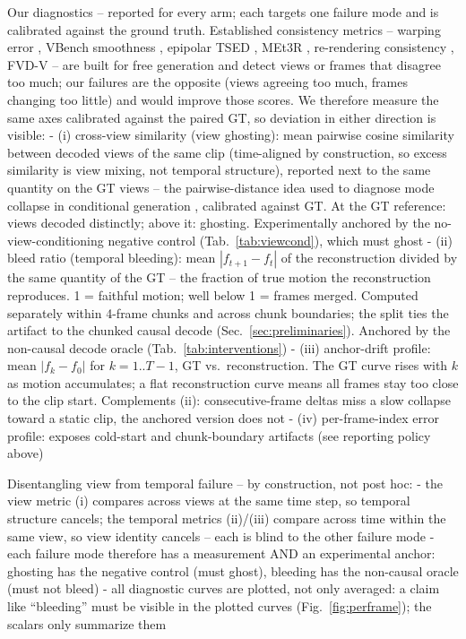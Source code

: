 Our diagnostics -- reported for every arm; each targets one failure mode and is calibrated against the ground truth. Established consistency metrics -- warping error \cite{lai2018learning}, VBench smoothness \cite{huang2024vbench}, epipolar TSED \cite{yu2023long}, MEt3R \cite{asim2025met3r}, re-rendering consistency \cite{gao2024cat3d}, FVD-V \cite{xie2024sv4d} -- are built for free generation and detect views or frames that disagree too much; our failures are the opposite (views agreeing too much, frames changing too little) and would improve those scores. We therefore measure the same axes calibrated against the paired GT, so deviation in either direction is visible:
- (i) cross-view similarity (view ghosting): mean pairwise cosine similarity between decoded views of the same clip (time-aligned by construction, so excess similarity is view mixing, not temporal structure), reported next to the same quantity on the GT views -- the pairwise-distance idea used to diagnose mode collapse in conditional generation \cite{zhu2017toward}, calibrated against GT. At the GT reference: views decoded distinctly; above it: ghosting. Experimentally anchored by the no-view-conditioning negative control (Tab.~\ref{tab:viewcond}), which must ghost
- (ii) bleed ratio (temporal bleeding): mean $|f_{t+1} - f_t|$ of the reconstruction divided by the same quantity of the GT -- the fraction of true motion the reconstruction reproduces. 1 = faithful motion; well below 1 = frames merged. Computed separately within 4-frame chunks and across chunk boundaries; the split ties the artifact to the chunked causal decode (Sec.~\ref{sec:preliminaries}). Anchored by the non-causal decode oracle (Tab.~\ref{tab:interventions})
- (iii) anchor-drift profile: mean $|f_k - f_0|$ for $k = 1..T{-}1$, GT vs.\ reconstruction. The GT curve rises with $k$ as motion accumulates; a flat reconstruction curve means all frames stay too close to the clip start. Complements (ii): consecutive-frame deltas miss a slow collapse toward a static clip, the anchored version does not
- (iv) per-frame-index error profile: exposes cold-start and chunk-boundary artifacts (see reporting policy above)

Disentangling view from temporal failure -- by construction, not post hoc:
- the view metric (i) compares across views at the same time step, so temporal structure cancels; the temporal metrics (ii)/(iii) compare across time within the same view, so view identity cancels -- each is blind to the other failure mode
- each failure mode therefore has a measurement AND an experimental anchor: ghosting has the negative control (must ghost), bleeding has the non-causal oracle (must not bleed)
- all diagnostic curves are plotted, not only averaged: a claim like ``bleeding'' must be visible in the plotted curves (Fig.~\ref{fig:perframe}); the scalars only summarize them

